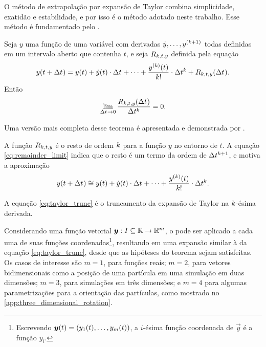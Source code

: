O método de extrapolação por expansão de Taylor combina simplicidade, exatidão e estabilidade, e por isso é o método adotado neste trabalho. Esse método é fundamentado pelo .

\begin{unnumberedtheorem} \label{theo:taylor}
	Seja \(y\) uma função de uma variável com derivadas \(\deriv{1}{y},\dotsc,y^{\pqty{\taylorOrder+1}}\) todas definidas em um intervalo aberto que contenha \(t\), e seja \(R_{k,t,y}\) definida pela equação
    \begin{equation*}
    	y(t + \Dt) = y(t) + \deriv{1}{y}(t)\cdot\Dt + \dotsb + \dfrac{\deriv{\taylorOrder}{y}(t)}{\taylorOrder!}\cdot\Dt^\taylorOrder + \remainderFunction{\taylorOrder}{t}{y}(\Dt).
    \end{equation*}
    Então
    \begin{equation} \label{eq:remainder_limit}
    	\lim_{\Delta t_{} \rightarrow 0} \dfrac{R_{k,t,y}(\Delta t_{})}{\Delta t_{}^k} = 0.
    \end{equation}
\end{unnumberedtheorem}

Uma versão mais completa desse teorema é apresentada e demonstrada por .

A função \(R_{k,t,y}\) é o resto de ordem \(k\) para a função \(y\) no entorno de \(t\). A equação \eqref{eq:remainder_limit} indica que o resto é um termo da ordem de \(\Delta t_{}^{k+1}\), e motiva a aproximação
\begin{equation} \label{eq:taylor_trunc}
    y(t + \Dt) \approximately y(t) + \deriv{1}{y}(t)\cdot\Dt + \dotsb + \dfrac{\deriv{\taylorOrder}{y}(t)}{\taylorOrder!}\cdot\Dt^\taylorOrder.
\end{equation}

A equação \eqref{eq:taylor_trunc} é o truncamento da expansão de Taylor na \(k\)-ésima derivada.

Considerando uma função vetorial \(\bm{y}:I\subseteq \mathbb{R} \rightarrow \mathbb{R}^m\), o  pode ser aplicado a cada uma de suas funções coordenadas\footnote{Escrevendo \(\vec{y}(t) = \pqty{y_1(t),\dotsc,y_m(t)}\), a \(i\)-ésima função coordenada de \(\vec{y}\) é a função \(y_i\).}, resultando em uma expansão similar à da equação \eqref{eq:taylor_trunc}, desde que as hipóteses do teorema sejam satisfeitas. Os casos de interesse são \(m=1\), para funções reais; \(m=2\), para vetores bidimensionais como a posição de uma partícula em uma simulação em duas dimensões; \(m=3\), para simulações em três dimensões; e \(m=4\) para algumas parametrizações para a orientação das partículas, como mostrado no \autoref{app:three_dimensional_rotation}.

